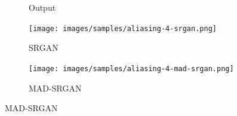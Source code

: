 \documentclass[12pt,a4paper]{article}
\begin{document}
\begin{figure}[H]
\begin{subfigure}{0.2\textwidth}
                \caption*{Output}
            \end{subfigure}
            \enspace
            \begin{subfigure}{0.2\textwidth}
                \texttt{[image: images/samples/aliasing-4-srgan.png]}
                \caption*{SRGAN}
            \end{subfigure}
            \enspace
            \begin{subfigure}{0.2\textwidth}
                \texttt{[image: images/samples/aliasing-4-mad-srgan.png]}
                \caption*{MAD-SRGAN}
            \end{subfigure}
        \end{figure}
\end{document}
